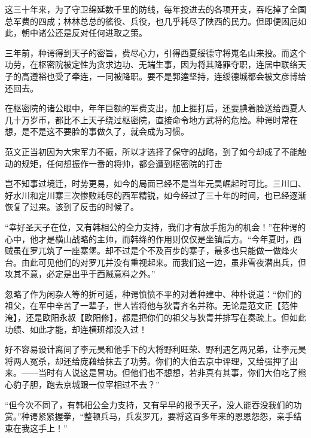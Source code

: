 这三十年来，为了守卫绵延数千里的防线，每年投进去的各项开支，吞吃掉了全国总军费的四成；林林总总的徭役、兵役，也几乎耗尽了陕西的民力。但即便困厄如此，朝中诸公还是反对任何进取之策。

三年前，种谔得到天子的密旨，费尽心力，引得西夏绥德守将嵬名山来投。而这个功劳，在枢密院被定性为贪求边功、无端生事，因为将其降罪夺职，连居中联络天子的高遵裕也受了牵连，一同被降职。要不是郭逵坚持，连绥德城都会被文彦博给还回去。

在枢密院的诸公眼中，年年巨额的军费支出，加上捱打后，还要腆着脸送给西夏人几十万岁币，都比不上天子绕过枢密院，直接命令地方武将的危险。种谔时常在想，是不是这不要脸的事做久了，就会成为习惯。

范文正当初因为大宋军力不振，所以才选择了保守的战略，到了如今却成了不能触动的规矩，任何想振作一番的将帅，都会遭到枢密院的打击

岂不知事过境迁，时势更易，如今的局面已经不是当年元昊崛起时可比。三川口、好水川和定川寨三次惨败耗尽的西军精锐，如今经过了三十年的时间，也已经逐渐恢复了过来。该到了反击的时候了。

“幸好圣天子在位，又有韩相公的全力支持，我们才有放手施为的机会！”在种谔的心中，他才是横山战略的主帅，而韩绛的作用则仅仅是坐镇后方。“今年夏时，西贼虽在罗兀筑了一座寨堡。却不过是个不及百步的寨子，最多也只能做一做烽火台。由此可见他们的对罗兀并没有重视起来。而我们这一边，虽非雪夜潜出兵，但攻其不意，必定是出乎于西贼意料之外。”

忽略了作为闲杂人等的折可适，种谔愤愤不平的对着种建中、种朴说道：“你们的祖父，在军中辛苦了一辈子，世人皆将他与狄青齐名并称。无论是范文正【范仲淹】，还是欧阳永叔【欧阳修】，都是把你们的祖父与狄青并排写在奏疏上。但如此功绩、如此才能，却连横班都没入过！

好不容易设计离间了李元昊和他手下的大将野利旺荣、野利遇乞两兄弟，让李元昊将两人冤杀，却还给庞藉给抹去了功劳。你们的大伯去京中评理，又给强押了出来。——当时有人说这是冒功。但他们也不想想，若非真有其事，你们大伯吃了熊心豹子胆，跑去京城跟一位宰相过不去？”

“但今次不同了，有韩相公全力支持，又有早早的报予天子，没人能吞没我们的功赏。”种谔紧紧握拳，“整顿兵马，兵发罗兀，要将这百多年来的恩恩怨怨，亲手结束在我这手上！”

